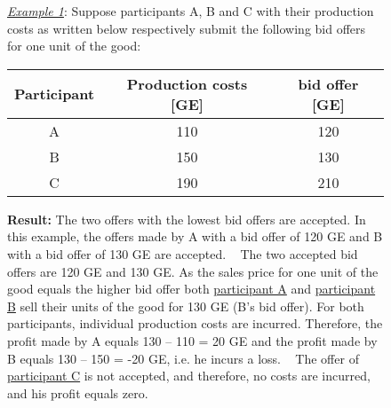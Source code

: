 \documentclass[11pt]{article}
\begin{document}
\begin{figure}[h!] 
	\begin{minipage}[t]{1\linewidth} 
		\begin{tcolorbox}[colback=pink,arc=0pt,colframe=black!25]
			\underline{\textit{Example 1}}: Suppose participants A, B and C with their production costs as written below respectively submit the following bid offers for one unit of the good:
			\begin{center}
				\begin{tabular}{c|cc}
					Participant & Production costs [GE] & bid offer [GE] \\
					\hline
					A			& 110				 	& 120 	\\
					B			& 150	 				& 130   \\
					C			& 190					& 210
				\end{tabular} \bigbreak	
			\end{center}	
			\textbf{Result:} The two offers with the lowest bid offers are accepted. In this example, the offers made by A with a bid offer of 120 GE and B with a bid offer of 130 GE are accepted. ~\medbreak
			The two accepted bid offers are 120 GE and 130 GE. As the sales price for one unit of the good equals the higher bid offer both \underline{participant A} and \underline{participant B} sell their units of the good for 130 GE (B's bid offer). For both participants, individual production costs are incurred. Therefore, the profit made by A equals 130 – 110 = 20 GE and the profit made by B equals 130 – 150 = -20 GE, i.e. he incurs a loss. ~\medbreak
			The offer of \underline{participant C} is not accepted, and therefore, no costs are incurred, and his profit equals zero.      
		\end{tcolorbox} 
	\end{minipage}  
\end{figure}

\end{document}
